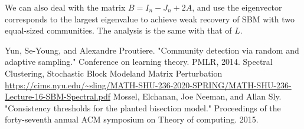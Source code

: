 \documentclass{article}
\begin{document}
We can also deal with the matrix $B=I_n-J_n+2A$,
and use the eigenvector corresponds to the largest eigenvalue to
achieve weak recovery of SBM with two equal-sized communities.
The analysis is the same with that of $L$.


\begin{thebibliography}{9}
 Yun, Se-Young, and Alexandre Proutiere. "Community detection via random and adaptive sampling." Conference on learning theory. PMLR, 2014.
 Spectral Clustering, Stochastic Block Modeland Matrix Perturbation \url{https://cims.nyu.edu/~sling/MATH-SHU-236-2020-SPRING/MATH-SHU-236-Lecture-16-SBM-Spectral.pdf}
Mossel, Elchanan, Joe Neeman, and Allan Sly. "Consistency thresholds for the planted bisection model." Proceedings of the forty-seventh annual ACM symposium on Theory of computing. 2015.
\end{thebibliography}
\end{document}
